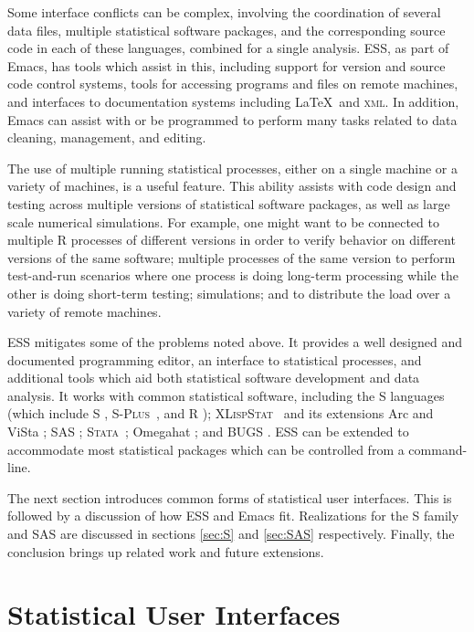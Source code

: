 \documentclass{article}
\newcommand*{\Splus}{\textsc{S-Plus}}
\newcommand*{\XLispStat}{\textsc{XLispStat}}
\newcommand*{\Stata}{\textsc{Stata}}
\begin{document}
Some interface conflicts can be complex, involving the coordination of
several data files, multiple statistical software packages, and the
corresponding source code in each of these languages, combined for a
single analysis.  ESS, as part of Emacs, has tools which assist in
this, including support for version and source code control systems,
tools for accessing programs and files on remote machines, and
interfaces to documentation systems including \LaTeX\ and
\textsc{xml}.  In addition, Emacs can assist with or be programmed to
perform many tasks related to data cleaning, management, and editing.

The use of multiple running statistical processes, either on a single
machine or a variety of machines, is a useful feature.  This ability
assists with code design and testing across multiple versions of
statistical software packages, as well as large scale numerical
simulations.  For example, one might want to be connected to multiple
R processes of different versions in order to verify behavior on
different versions of the same software; multiple processes of the
same version to perform test-and-run scenarios where one process is
doing long-term processing while the other is doing short-term
testing; simulations; and to distribute the load over a variety of
remote machines.

ESS mitigates some of the problems noted above.  It provides a well
designed and documented programming editor, an interface to
statistical processes, and additional tools which aid both statistical
software development and data analysis.  It works with common
statistical software, including the S languages (which include S
\citep{BecRCW88,ChaJH92,ChaJ98}, \Splus\ \citep{Splus}, and R
\citep{ihak:gent:1996}); \XLispStat\ \citep{Tier90} and its extensions
Arc \citep{Cook:Weisberg:1999} and ViSta \citep{youn:fald:mcfa:1992};
SAS \citep{SAS:8.0}; \Stata\ \citep{Stata:6.0}; Omegahat
\citep{DTLang:2000}; and BUGS \citep{SpieThomBest:1999}.  ESS can be
extended to accommodate most statistical packages which can be
controlled from a command-line.

The next section introduces common forms of statistical user
interfaces.  This is followed by a discussion of how ESS and Emacs
fit.  Realizations for the S family and SAS are discussed in sections
\ref{sec:S} and \ref{sec:SAS} respectively.  Finally, the conclusion
brings up related work and future extensions.

\section{Statistical User Interfaces}
\label{sec:UI}
\end{document}

